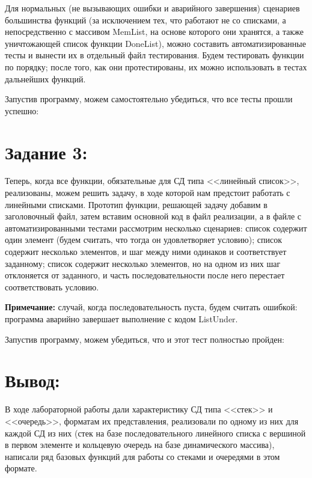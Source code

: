 \documentclass[12pt]{article}
\begin{document}
{	Для нормальных (не вызывающих ошибки и аварийного завершения) сценариев большинства функций (за исключением тех, что работают не со списками, а непосредственно с массивом MemList, на основе которого они хранятся, а также уничтожающей список функции DoneList), можно составить автоматизированные тесты и вынести их в отдельный файл тестирования. Будем тестировать функции по порядку; после того, как они протестированы, их можно использовать в тестах дальнейших функций.
	

	
	Запустив программу, можем самостоятельно убедиться, что все тесты прошли успешно:
	
	\section{Задание 3:}
	\label{task_3}
	
	Теперь, когда все функции, обязательные для СД типа <<линейный список>>, реализованы, можем решить задачу, в ходе которой нам предстоит работать с линейными списками. Прототип функции, решающей задачу добавим в заголовочный файл, затем вставим основной код в файл реализации, а в файле с автоматизированными тестами рассмотрим несколько сценариев: список содержит один элемент (будем считать, что тогда он удовлетворяет условию); список содержит несколько элементов, и шаг между ними одинаков и соответствует заданному; список содержит несколько элементов, но на одном из них шаг отклоняется от заданного, и часть последовательности после него перестает соответствовать условию.
	
	{\bf Примечание:} случай, когда последовательность пуста, будем считать ошибкой: программа аварийно завершает выполнение с кодом ListUnder.
	


	
	Запустив программу, можем убедиться, что и этот тест полностью пройден:
	
	
	\section{Вывод:}
	
	В ходе лабораторной работы дали характеристику СД типа <<стек>> и <<очередь>>, форматам их представления, реализовали по одному из них для каждой СД из них (стек на базе последовательного линейного списка с вершиной в первом элементе и кольцевую очередь на базе динамического массива), написали ряд базовых функций для работы со стеками и очередями в этом формате.
	
}
\end{document}
